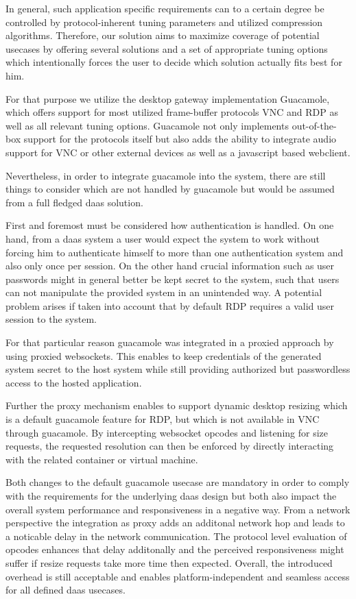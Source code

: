 \documentclass[runningheads]{llncs}
\begin{document}
In general, such application specific requirements can to a certain degree be controlled
by protocol-inherent tuning parameters and utilized compression algorithms.
Therefore, our solution aims to maximize coverage of potential usecases
by offering several solutions and a set of appropriate tuning options
which intentionally forces the user to decide
which solution actually fits best for him.

For that purpose we utilize the desktop gateway implementation Guacamole,
which offers support for most utilized frame-buffer protocols VNC and RDP
as well as all relevant tuning options.
Guacamole not only implements out-of-the-box support for the protocols itself
but also adds the ability to integrate audio support for VNC or other external devices
as well as a javascript based webclient.

Nevertheless, in order to integrate guacamole into the system,
there are still things to consider which are not handled by guacamole
but would be assumed from a full fledged daas solution.

First and foremost must be considered how authentication is handled.
On one hand, from a daas system a user would expect the system to work
without forcing him to authenticate himself
to more than one authentication system and also only once per session.
On the other hand crucial information such as user passwords
might in general better be kept secret to the system,
such that users can not manipulate the provided system in an unintended way.
A potential problem arises if taken into account
that by default RDP requires a valid user session to the system.

For that particular reason guacamole was integrated
in a proxied approach by using proxied websockets.
This enables to keep credentials of the generated system secret to the host system
while still providing authorized but passwordless access to the hosted application.

Further the proxy mechanism enables to support dynamic desktop resizing
which is a default guacamole feature for RDP,
but which is not available in VNC through guacamole.
By intercepting websocket opcodes and listening for size requests,
the requested resolution can then be enforced
by directly interacting with the related container or virtual machine.

Both changes to the default guacamole usecase are mandatory
in order to comply with the requirements for the underlying daas design
but both also impact the overall system performance and responsiveness in a negative way.
From a network perspective the integration as proxy adds an additonal network hop
and leads to a noticable delay in the network communication.
The protocol level evaluation of opcodes enhances that delay additonally
and the perceived responsiveness might suffer
if resize requests take more time then expected.
Overall, the introduced overhead is still acceptable
and enables platform-independent and seamless access for all defined daas usecases.
\end{document}
